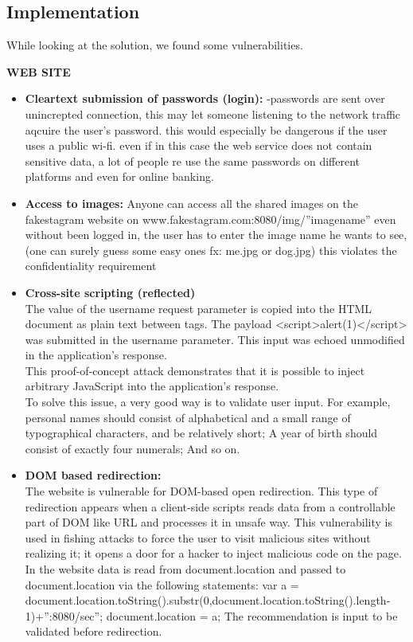 \subsection{Implementation}

While looking at the solution, we found some vulnerabilities. \\

\begin{center}
\textbf{WEB SITE}
\end{center}
\begin{itemize}  
\item \textbf{Cleartext submission of passwords (login):}
-passwords are sent over unincrepted connection, this may let someone listening to the network traffic aqcuire the user's password.
this would especially be dangerous if the user uses a public wi-fi.
even if in this case the web service does not contain sensitive data, a lot of people re use the same passwords on different platforms and even for online banking.

\item \textbf{Access to images:}
Anyone can access all the shared images on the fakestagram website on www.fakestagram.com:8080/img/''imagename'' even without been logged in, the user has to enter the image name he wants to see,(one can surely guess some easy ones fx: me.jpg or dog.jpg)
this violates the confidentiality requirement


\item \textbf{Cross-site scripting (reflected)} \\

The value of the username request parameter is copied into the HTML document as plain text between tags. The payload <script>alert(1)</script> was submitted in the username parameter. This input was echoed unmodified in the application's response. \\

This proof-of-concept attack demonstrates that it is possible to inject arbitrary JavaScript into the application's response. \\

To solve this issue, a very good way is to validate user input. For example, personal names should consist of alphabetical and a small range of typographical characters, and be relatively short; A year of birth should consist of exactly four numerals; And so on.

\item \textbf{DOM based redirection:}\\
The website is vulnerable for DOM-based open redirection. This type of redirection appears when a client-side scripts reads data from a controllable part of DOM like URL and processes it in unsafe way. This vulnerability is used in fishing attacks to force the user to visit malicious sites without realizing it; it opens a door for a hacker to inject malicious code on the page. In the website data is read from document.location and passed to document.location via the following statements: var a = document.location.toString().substr(0,document.location.toString().length-
1)+”:8080/sec”; document.location = a;
The recommendation is input to be validated before redirection.



\end{itemize}
